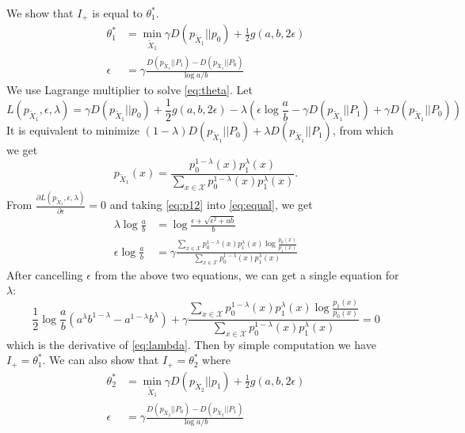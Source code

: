 \documentclass{article}
\begin{document}
We show that $I_+$ is equal to $\theta_1^*$.
\begin{align}
\theta^*_1 &= \min_{\widetilde{X}_1} \gamma D(p_{\widetilde{X}_1}|| p_0)+ \frac{1}{2} g(a,b, 2\epsilon)  \label{eq:theta}\\
\epsilon &= \gamma \frac{D(p_{\widetilde{X}_1} || P_1) - D(p_{\widetilde{X}_1} || P_0) }{\log a /b}\label{eq:equal}
\end{align}
We use Lagrange multiplier to solve \eqref{eq:theta}.
Let
$$
L(p_{\widetilde{X}_1},\epsilon, \lambda)
=\gamma D(p_{\widetilde{X}_1}|| p_0)+ \frac{1}{2} g(a,b, 2\epsilon) - \lambda(\epsilon \log\frac{a}{b}-\gamma
D(p_{\widetilde{X}_1} || P_1) + \gamma D(p_{\widetilde{X}_1} || P_0))
$$
It is equivalent to minimize
$(1-\lambda)D(p_{\widetilde{X}_1} || P_0) +
\lambda D(p_{\widetilde{X}_1} || P_1) $, from
which we get
\begin{equation}\label{eq:p12}
p_{\widetilde{X}_1}(x) = \frac{p_0^{1-\lambda}(x)p_1^{\lambda}(x)}{\sum_{x \in \mathcal{X}}p_0^{1-\lambda}(x) p_1^{\lambda} (x)}.
\end{equation}
From $\frac{\partial L(p_{\widetilde{X}_1},\epsilon, \lambda)}{\partial \epsilon}=0$ and taking \eqref{eq:p12}
into \eqref{eq:equal}, we get
\begin{align*}
    \lambda \log \frac{a}{b}
    & = \log \frac{\epsilon + \sqrt{\epsilon^2+ab}}{b} \\
    \epsilon \log \frac{a}{b}
    & = \gamma\frac{\sum_{x \in \mathcal{X}}p_0^{1-\lambda}(x) p_1^{\lambda} (x)\log \frac{p_0(x)}{p_1(x)}}{\sum_{x \in \mathcal{X}}p_0^{1-\lambda}(x) p_1^{\lambda} (x)}
\end{align*}
After cancelling $\epsilon$
from the above two equations, we can get a single equation
for $\lambda$:
\begin{equation}
    \frac{1}{2}\log\frac{a}{b}
    (a^{\lambda} b^{1-\lambda}
    -a^{1-\lambda} b^{\lambda})
    + \gamma \frac{\sum_{x \in \mathcal{X}}p_0^{1-\lambda}(x) p_1^{\lambda} (x)\log \frac{p_1(x)}{p_0(x)}}{\sum_{x \in \mathcal{X}}p_0^{1-\lambda}(x) p_1^{\lambda} (x)}=0
\end{equation}
which is the derivative of \eqref{eq:lambda}.
Then by simple computation we have
$I_+ = \theta_1^*$.
We can also show that $I_+=\theta_2^*$
where
\begin{align}
\theta^*_2 &= \min_{\widetilde{X}_1} \gamma D(p_{\widetilde{X}_2}|| p_1)+ \frac{1}{2} g(a,b, 2\epsilon)  \label{eq:theta2}\\
\epsilon &= \gamma \frac{D(p_{\widetilde{X}_2} || P_0) - D(p_{\widetilde{X}_2} || P_1) }{\log a /b}\label{eq:equal2}
\end{align}
\end{document}
